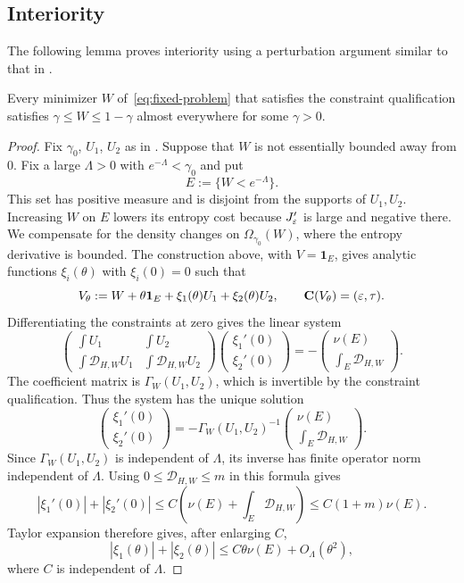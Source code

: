 \subsection{Interiority}\label{sec:fixed-interiority}

The following lemma proves interiority using a perturbation argument
similar to that in .

\begin{lemma}\label{lem:fixed-interior}
Every minimizer $W$ of~\eqref{eq:fixed-problem} that satisfies the constraint
qualification satisfies $\gamma\le W\le1-\gamma$ almost everywhere
for some $\gamma>0$.
\end{lemma}

\begin{proof}
Fix $\gamma_0$, $U_1$, $U_2$ as in .
Suppose that $W$ is not essentially bounded away from $0$.  Fix a large
$\Lambda>0$ with $e^{-\Lambda}<\gamma_0$ and put
\[
  E:=\{W<e^{-\Lambda}\}.
\]
This set has positive measure and is disjoint from the supports of $U_1,U_2$.
Increasing $W$ on $E$ lowers its entropy cost because $J_\varepsilon'$ is large
and negative there.  We compensate for the density changes on
$\Omega_{\gamma_0}(W)$, where the entropy derivative is bounded.
The construction above, with $V=\mathbf1_E$, gives analytic
functions $\xi_i(\theta)$ with $\xi_i(0)=0$ such that
\[
  V_\theta:=W+\theta\mathbf1_E+\xi_1(\theta)U_1+\xi_2(\theta)U_2,
  \qquad \mathbf C(V_\theta)=(\varepsilon,\tau).
\]
Differentiating the constraints at zero gives the linear system
\[
  \begin{pmatrix}
    \int U_1 & \int U_2\\[1mm]
    \int\mathcal D_{H,W}U_1 & \int\mathcal D_{H,W}U_2
  \end{pmatrix}
  \begin{pmatrix}\xi_1'(0)\\\xi_2'(0)\end{pmatrix}
  =-\begin{pmatrix}\nu(E)\\\int_E\mathcal D_{H,W}\end{pmatrix}.
\]
The coefficient matrix is $\Gamma_W(U_1,U_2)$, which is invertible by
the constraint qualification.  Thus the system has the unique solution
\[
  \begin{pmatrix}\xi_1'(0)\\\xi_2'(0)\end{pmatrix}
  =-\Gamma_W(U_1,U_2)^{-1}
    \begin{pmatrix}\nu(E)\\\int_E\mathcal D_{H,W}\end{pmatrix}.
\]
Since $\Gamma_W(U_1,U_2)$ is independent of $\Lambda$, its inverse has
finite operator norm independent of $\Lambda$.
Using $0\le\mathcal D_{H,W}\le m$ in this formula gives
\[
  |\xi_1'(0)|+|\xi_2'(0)|
  \le C\left(\nu(E)+\int_E\mathcal D_{H,W}\right)
  \le C(1+m)\nu(E).
\]
Taylor expansion therefore gives, after enlarging $C$,
\[
  |\xi_1(\theta)|+|\xi_2(\theta)|
  \le C\theta\nu(E)+O_\Lambda(\theta^2),
\]
where $C$ is independent of $\Lambda$.


\end{proof}
